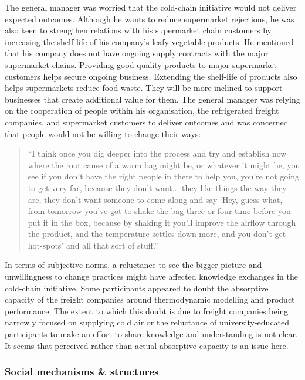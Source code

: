 The general manager was worried that the cold-chain initiative would not deliver expected outcomes. Although he wants to reduce supermarket rejections, he was also keen to strengthen relations with his supermarket chain customers by increasing the shelf-life of his company's leafy vegetable products. He mentioned that his company does not have ongoing supply contracts with the major supermarket chains. Providing good quality products to major supermarket customers helps secure ongoing business. Extending the shelf-life of products also helps supermarkets reduce food waste. They will be more inclined to support businesses that create additional value for them. The general manager was relying on the cooperation of people within his organisation, the refrigerated freight companies, and supermarket customers to deliver outcomes and was concerned that people would not be willing to change their ways:

\begin{quote}
\small
\enquote{I think once you dig deeper into the process and try and establish now where the root cause of a warm bag might be, or whatever it might be, you see if you don't have the right people in there to help you, you’re not going to get very far, because they don't want... they like things the way they are, they don't want someone to come along and say \enquote{Hey, guess what, from tomorrow you've got to shake the bag three or four time before you put it in the box, because by shaking it you'll improve the airflow through the product, and the temperature settles down more, and you don't get hot-spots} and all that sort of stuff.} \\
\end{quote}

In terms of subjective norms, a reluctance to see the bigger picture and unwillingness to change practices might have affected knowledge exchanges in the cold-chain initiative. Some participants appeared to doubt the absorptive capacity of the freight companies around thermodynamic modelling and product performance. The extent to which this doubt is due to freight companies being narrowly focused on supplying cold air or the reluctance of university-educated participants to make an effort to share knowledge and understanding is not clear. It seems that perceived rather than actual absorptive capacity is an issue here.

\subsubsection{Social mechanisms \& structures}

